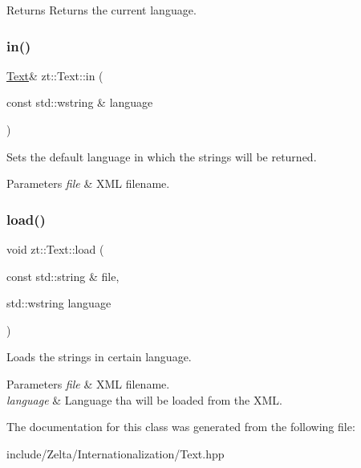 \begin{DoxyReturn}{Returns}
Returns the current language. 
\end{DoxyReturn}
\mbox{\label{classzt_1_1_text_aa1dc0e4e2fef138ead0918b9f64b9c4f}} 
\subsubsection{\texorpdfstring{in()}{in()}}
{\footnotesize\ttfamily \hyperlink{classzt_1_1_text}{Text}\& zt\+::\+Text\+::in (\begin{DoxyParamCaption}\item[{const std\+::wstring \&}]{language }\end{DoxyParamCaption})}



Sets the default language in which the strings will be returned. 


\begin{DoxyParams}{Parameters}
{\em file} & X\+ML filename. \\
\hline
\end{DoxyParams}
\mbox{\label{classzt_1_1_text_a7bee96c860d0c2a6157e59575cd0fc54}} 
\subsubsection{\texorpdfstring{load()}{load()}}
{\footnotesize\ttfamily void zt\+::\+Text\+::load (\begin{DoxyParamCaption}\item[{const std\+::string \&}]{file,  }\item[{std\+::wstring}]{language }\end{DoxyParamCaption})}



Loads the strings in certain language. 


\begin{DoxyParams}{Parameters}
{\em file} & X\+ML filename. \\
\hline
{\em language} & Language tha will be loaded from the X\+ML. \\
\hline
\end{DoxyParams}


The documentation for this class was generated from the following file\+:\begin{DoxyCompactItemize}
\item 
include/\+Zelta/\+Internationalization/Text.\+hpp\end{DoxyCompactItemize}
